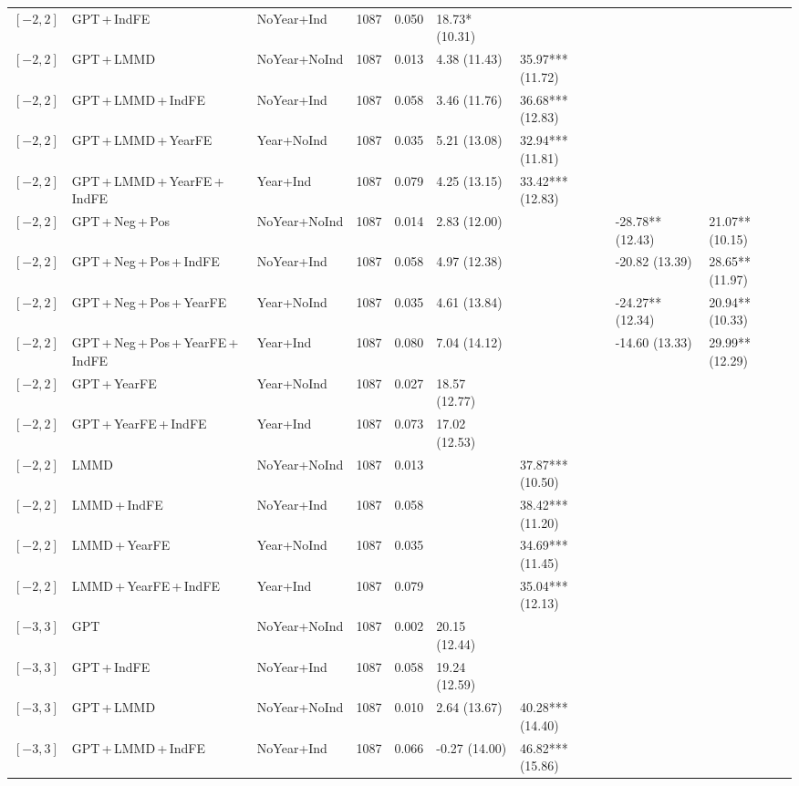 \begin{table}[p]
\begin{tabular}{lllrrllll}
$[-2,2]$ & GPT\,+\,IndFE & NoYear+Ind & 1087 & 0.050 & 18.73* (10.31) &  &  &  \\
$[-2,2]$ & GPT\,+\,LMMD & NoYear+NoInd & 1087 & 0.013 & 4.38 (11.43) & 35.97*** (11.72) &  &  \\
$[-2,2]$ & GPT\,+\,LMMD\,+\,IndFE & NoYear+Ind & 1087 & 0.058 & 3.46 (11.76) & 36.68*** (12.83) &  &  \\
$[-2,2]$ & GPT\,+\,LMMD\,+\,YearFE & Year+NoInd & 1087 & 0.035 & 5.21 (13.08) & 32.94*** (11.81) &  &  \\
$[-2,2]$ & GPT\,+\,LMMD\,+\,YearFE\,+\,IndFE & Year+Ind & 1087 & 0.079 & 4.25 (13.15) & 33.42*** (12.83) &  &  \\
$[-2,2]$ & GPT\,+\,Neg\,+\,Pos & NoYear+NoInd & 1087 & 0.014 & 2.83 (12.00) &  & -28.78** (12.43) & 21.07** (10.15) \\
$[-2,2]$ & GPT\,+\,Neg\,+\,Pos\,+\,IndFE & NoYear+Ind & 1087 & 0.058 & 4.97 (12.38) &  & -20.82 (13.39) & 28.65** (11.97) \\
$[-2,2]$ & GPT\,+\,Neg\,+\,Pos\,+\,YearFE & Year+NoInd & 1087 & 0.035 & 4.61 (13.84) &  & -24.27** (12.34) & 20.94** (10.33) \\
$[-2,2]$ & GPT\,+\,Neg\,+\,Pos\,+\,YearFE\,+\,IndFE & Year+Ind & 1087 & 0.080 & 7.04 (14.12) &  & -14.60 (13.33) & 29.99** (12.29) \\
$[-2,2]$ & GPT\,+\,YearFE & Year+NoInd & 1087 & 0.027 & 18.57 (12.77) &  &  &  \\
$[-2,2]$ & GPT\,+\,YearFE\,+\,IndFE & Year+Ind & 1087 & 0.073 & 17.02 (12.53) &  &  &  \\
$[-2,2]$ & LMMD & NoYear+NoInd & 1087 & 0.013 &  & 37.87*** (10.50) &  &  \\
$[-2,2]$ & LMMD\,+\,IndFE & NoYear+Ind & 1087 & 0.058 &  & 38.42*** (11.20) &  &  \\
$[-2,2]$ & LMMD\,+\,YearFE & Year+NoInd & 1087 & 0.035 &  & 34.69*** (11.45) &  &  \\
$[-2,2]$ & LMMD\,+\,YearFE\,+\,IndFE & Year+Ind & 1087 & 0.079 &  & 35.04*** (12.13) &  &  \\
$[-3,3]$ & GPT & NoYear+NoInd & 1087 & 0.002 & 20.15 (12.44) &  &  &  \\
$[-3,3]$ & GPT\,+\,IndFE & NoYear+Ind & 1087 & 0.058 & 19.24 (12.59) &  &  &  \\
$[-3,3]$ & GPT\,+\,LMMD & NoYear+NoInd & 1087 & 0.010 & 2.64 (13.67) & 40.28*** (14.40) &  &  \\
$[-3,3]$ & GPT\,+\,LMMD\,+\,IndFE & NoYear+Ind & 1087 & 0.066 & -0.27 (14.00) & 46.82*** (15.86) &  &  \\

\end{tabular}
\end{table}
